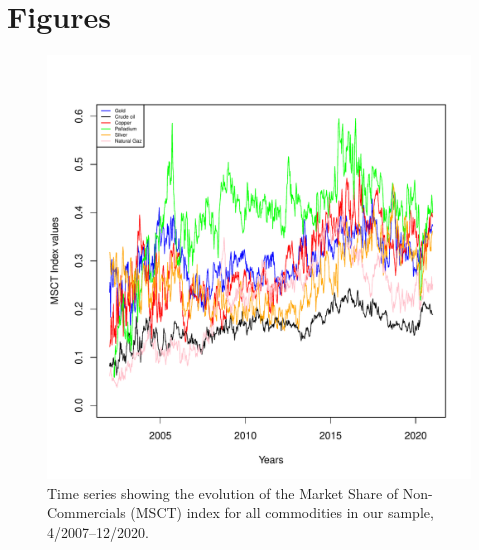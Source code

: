 
\section{Figures}


	\begin{figure}[h]
	\centering
		\includegraphics[scale=0.8]{FIG_MSCT}
		\caption{Time series showing the evolution of the Market Share of Non-Commercials (MSCT) index for all commodities in our sample, 4/2007--12/2020. }
		\label{fig:MSCT}
	\end{figure}


